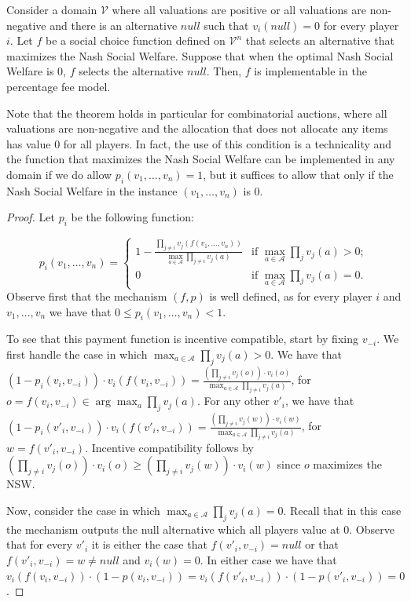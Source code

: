 \documentclass{theoretics}
\newcommand{\cA}{{\mathcal A}}
\begin{document}
\begin{theorem}
\label{thm:VCG}
Consider a domain $\mathcal V$ where all valuations are positive or all valuations are non-negative and there is an alternative $null$ such that $v_i(null)=0$ for every player $i$. Let $f$ be a social choice function defined on $\mathcal V^n$ that selects an alternative that maximizes the Nash Social Welfare. Suppose that when the optimal Nash Social Welfare is $0$, $f$ selects the alternative $null$. Then, $f$ is implementable in the percentage fee model.

\end{theorem}

Note that the theorem holds in particular for combinatorial auctions, where all valuations are non-negative and the allocation that does not allocate any items has value $0$ for all players. In fact, the use of this condition is a technicality and the function that maximizes the Nash Social Welfare can be implemented in any domain if we do allow $p_i(v_1,\ldots, v_n)=1$, but it suffices to allow that only if the Nash Social Welfare in the instance $(v_1,\ldots, v_n)$ is $0$.

\begin{proof}
Let $p_i$ be the following function:

$$
p_i(v_1,\ldots,v_n) = 
\begin{cases}
1 -  \frac{\prod_{j \neq i} v_j(f(v_1,\ldots, v_n))}{\max_{a \in \cA} \prod_{j \neq i} v_j(a)} & \text{if $\max_{a \in \cA} \prod_{j} v_j(a)> 0$};\\
0 & \text{if $\max_{a \in \cA} \prod_{j} v_j(a)= 0$}.
\end{cases}$$
Observe first that the mechanism $(f,p)$ is well defined, as for every player $i$ and $v_1,\ldots, v_n$ we have that $0\leq p_i(v_1,\ldots, v_n)<1$.

To see that this payment function is incentive compatible, start by fixing $v_{-i}$. We first handle the case in which $\max_{a \in \cA} \prod_{j} v_j(a)> 0$. We have that $(1-p_i(v_i, v_{-i}))\cdot v_i(f(v_i, v_{-i}))=\frac {\left(\prod_{j\neq i}v_j(o) \right)\cdot v_i(o)} {\max_{a \in \cA} \prod_{j \neq i} v_j(a)}$, for  $o=f(v_i,v_{-i})\in \arg\max_a \prod_{j}v_j(a)$. For any other $v'_i$, we have that $(1-p_i(v'_i, v_{-i}))\cdot v_i(f(v'_i, v_{-i}))=\frac {\left(\prod_{j\neq i}v_j(w) \right)\cdot v_i(w)} {\max_{a \in \cA} \prod_{j \neq i} v_j(a)}$, for $w=f(v'_i,v_{-i})$. Incentive compatibility follows by $\left(\prod_{j\neq i}v_j(o) \right)\cdot v_i(o) \geq \left(\prod_{j\neq i}v_j(w)\right)\cdot v_i(w)$ since $o$ maximizes the NSW. 

Now, consider the case in which $\max_{a \in \cA} \prod_{j} v_j(a)= 0$. Recall that in this case the mechanism outputs the null alternative which all players value at $0$. Observe that for every $v'_i$ it is either the case that $f(v'_i,v_{-i})=null$ or that $f(v'_i,v_{-i})=w\neq null$ and $v_i(w)=0$. In either case we have that $v_i(f(v_i,v_{-i})) \cdot(1-p(v_i,v_{-i}))= v_i(f(v'_i,v_{-i})) \cdot(1-p(v'_i,v_{-i}))=0$.





\end{proof}
\end{document}
